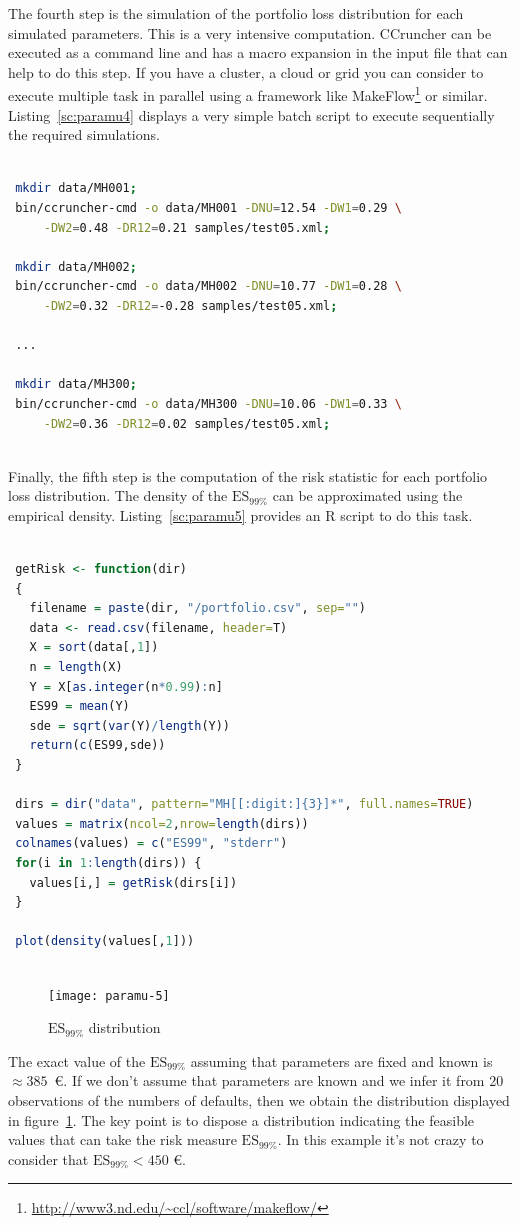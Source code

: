 \documentclass[11pt,fleqn]{book} %
\begin{document}
\begin{example}
	The fourth step is the simulation of the portfolio loss distribution
	for each simulated parameters. This is a very intensive computation.
	CCruncher can be executed as a command line and has a macro expansion in
	the input file that can help to do this step. If you have a cluster, a 
	cloud or grid you can consider to execute multiple task in parallel using 
	a framework like 
	MakeFlow\footnote{\url{http://www3.nd.edu/~ccl/software/makeflow/}} 
	or similar. Listing~\ref{sc:paramu4} displays a very simple batch
	script to execute sequentially the required simulations.
	\begin{lstlisting}[language=bash, label={sc:paramu4}, 
	caption={Execution of multiple CCrunchers (bash script)}]
 
 mkdir data/MH001;
 bin/ccruncher-cmd -o data/MH001 -DNU=12.54 -DW1=0.29 \
     -DW2=0.48 -DR12=0.21 samples/test05.xml; 
 
 mkdir data/MH002; 
 bin/ccruncher-cmd -o data/MH002 -DNU=10.77 -DW1=0.28 \
     -DW2=0.32 -DR12=-0.28 samples/test05.xml; 

 ...

 mkdir data/MH300; 
 bin/ccruncher-cmd -o data/MH300 -DNU=10.06 -DW1=0.33 \
     -DW2=0.36 -DR12=0.02 samples/test05.xml; 
 
	\end{lstlisting}

	Finally, the fifth step is the computation of the risk statistic
	for each portfolio loss distribution. The density of the $\text{ES}_{99\%}$ 
	can be approximated using the empirical density. Listing~\ref{sc:paramu5}
	provides an R script to do this task. 
	\begin{lstlisting}[language=R, label={sc:paramu5}, 
	caption={$ES_{99\%}$ distribution (R script)}]

 getRisk <- function(dir)
 {
   filename = paste(dir, "/portfolio.csv", sep="")
   data <- read.csv(filename, header=T)
   X = sort(data[,1])
   n = length(X)
   Y = X[as.integer(n*0.99):n]
   ES99 = mean(Y)
   sde = sqrt(var(Y)/length(Y))
   return(c(ES99,sde))
 }

 dirs = dir("data", pattern="MH[[:digit:]{3}]*", full.names=TRUE)
 values = matrix(ncol=2,nrow=length(dirs))
 colnames(values) = c("ES99", "stderr")
 for(i in 1:length(dirs)) {
   values[i,] = getRisk(dirs[i])
 }
 
 plot(density(values[,1]))
 
	\end{lstlisting}
	\begin{figure}[!ht]
		\centering
		\texttt{[image: paramu-5]}
		\caption{$\text{ES}_{99\%}$ distribution}
		\label{fig:paramu5}
	\end{figure}
	The exact value of the $\text{ES}_{99\%}$ assuming that parameters 
	are fixed and known is $\approx 385$\ \euro. If we don't assume that 
	parameters are known and we infer it from 20 observations of the
	numbers of defaults, then we obtain the distribution displayed in
	figure~\ref{fig:paramu5}. 
	The key point is to dispose a distribution indicating the 
	feasible values that can take the risk measure $\text{ES}_{99\%}$.
	In this example it's not crazy to consider that 
	$\text{ES}_{99\%} < 450$ \euro.
\end{example}
\end{document}
